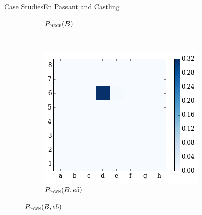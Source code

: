 \documentclass[9pt, unknownkeysallowed]{beamer}
\begin{document}
\begin{frame}{Case Studies}{En Passant and Castling}
\begin{figure}[H]
\begin{subfigure}[t]{0.3\textwidth}
        \caption{$P_{\textsc{piece}}(B)$}
    \end{subfigure}
    ~
  \centering
    \begin{subfigure}[t]{0.3\textwidth}
        \centering
        \includegraphics[width=\textwidth]{../img/best_moves/output_38_6.png}
        \caption{$P_{\textsc{pawn}}(B, e5)$}
    \end{subfigure}%
\end{figure}


\end{frame}
\end{document}
